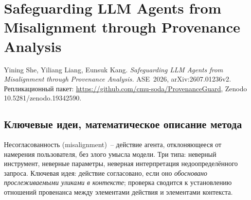 \section{Safeguarding LLM Agents from Misalignment through Provenance Analysis}

Yining She, Yiliang Liang, Eunsuk Kang. \emph{Safeguarding LLM Agents from Misalignment
through Provenance Analysis.} ASE~2026, arXiv:2607.01236v2. Репликационный пакет:
\url{https://github.com/cmu-soda/ProvenanceGuard}, Zenodo 10.5281/zenodo.19342590.

\cite{she2026provenanceguard}

\subsection{Ключевые идеи, математическое описание метода}
Несогласованность (misalignment)~-- действие агента, отклоняющееся от намерения
пользователя, без злого умысла модели. Три типа: неверный инструмент, неверные параметры,
неверная интерпретация недоопределённого запроса. Ключевая идея: действие согласовано,
если оно \emph{обосновано прослеживаемыми уликами в контексте}; проверка сводится
к установлению отношений провенанса между элементами действия и элементами контекста.

